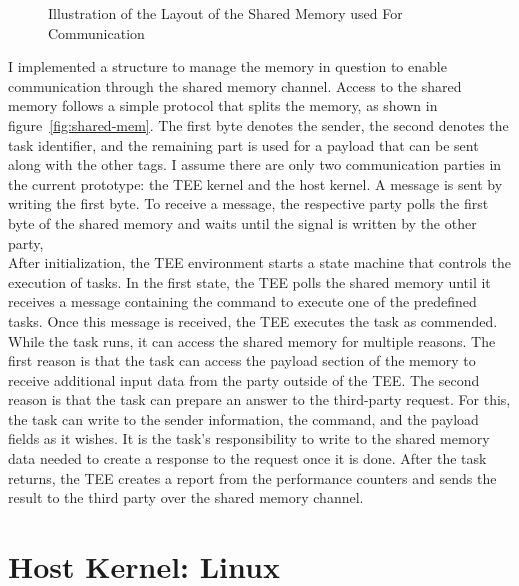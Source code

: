 \begin{center}
    \begin{figure}
        \centering
        
        \caption{Illustration of the Layout of the Shared Memory used For Communication}
        \label{fig:state:technical:paging}
    \end{figure}
\end{center}

I implemented a structure to manage the memory in question to enable
communication through the shared memory channel. Access to the shared memory
follows a simple protocol that splits the memory, as shown in
figure~\ref{fig:shared-mem}. The first byte denotes the sender, the second
denotes the task identifier, and the remaining part is used for a payload that
can be sent along with the other tags. I assume there are only two communication
parties in the current prototype: the TEE kernel and the host kernel. A message
is sent by writing the first byte. To receive a message, the respective party
polls the first byte of the shared memory and waits until the signal is written
by the other party, \\

After initialization, the TEE environment starts a state machine that controls
the execution of tasks. In the first state, the TEE polls the shared memory
until it receives a message containing the command to execute one of the
predefined tasks. Once this message is received, the TEE executes the task as
commended. While the task runs, it can access the shared memory for multiple
reasons. The first reason is that the task can access the payload section of the
memory to receive additional input data from the party outside of the TEE. The
second reason is that the task can prepare an answer to the third-party request.
For this, the task can write to the sender information, the command, and the
payload fields as it wishes. It is the task's responsibility to write to the
shared memory data needed to create a response to the request once it is done.
After the task returns, the TEE creates a report from the performance counters
and sends the result to the third party over the shared memory
channel. \\

\section{Host Kernel: Linux}
\label{sec:implementation:hostKernel}

